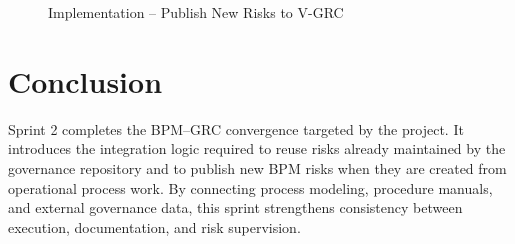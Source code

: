 \begin{figure}[H]
\centering
{}
\caption{Implementation -- Publish New Risks to V-GRC}
\label{fig:impl-grc-push}
\end{figure}

\section{Conclusion}

Sprint 2 completes the BPM--GRC convergence targeted by the project. It introduces the integration logic required to reuse risks already maintained by the governance repository and to publish new BPM risks when they are created from operational process work. By connecting process modeling, procedure manuals, and external governance data, this sprint strengthens consistency between execution, documentation, and risk supervision.
